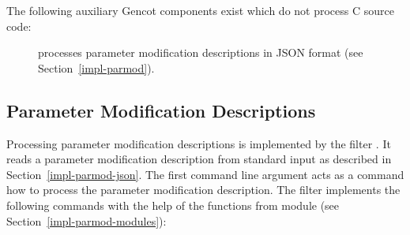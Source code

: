 The following auxiliary Gencot components exist which do not process C source code:
\begin{description}
\item[] processes parameter modification descriptions in JSON format (see Section~\ref{impl-parmod}).
\end{description}

\subsection{Parameter Modification Descriptions}

Processing parameter modification descriptions is implemented by the filter . It reads a parameter
modification description from standard input as described in Section~\ref{impl-parmod-json}. The first command line 
argument acts as a command how to process the parameter modification description. The filter implements the following
commands with the help of the functions from module   (see Section~\ref{impl-parmod-modules}):
